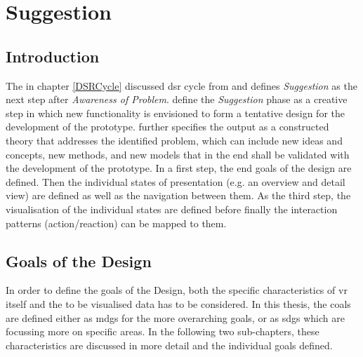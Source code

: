 
\chapter{Suggestion}

\label{ChapterSuggestion}


\section{Introduction}

The in chapter \ref{DSRCycle} discussed \gls{dsr} cycle from \cite{Vaishnavi2008} and \cite{Hevner2010} defines \textit{Suggestion} as the next step after \textit{Awareness of Problem}. \cite{Vaishnavi2008} define the \textit{Suggestion} phase as a creative step in which new functionality is envisioned to form a tentative design for the development of the prototype. \cite{Vaishnavi2008} further specifies the output as a constructed theory that addresses the identified problem, which can include new ideas and concepts, new methods, and new models that in the end shall be validated with the development of the prototype. \newline
In a first step, the end goals of the design are defined. Then the individual states of presentation (e.g. an overview and detail view) are defined as well as the navigation between them. As the third step, the visualisation of the individual states are defined before finally the interaction patterns (action/reaction) can be mapped to them.



\section{Goals of the Design}

In order to define the goals of the Design, both the specific characteristics of \gls{vr} itself and the to be visualised data has to be considered. In this thesis, the coals are defined either as \glspl{mdg} for the more overarching goals, or as \glspl{sdg} which are focussing more on specific areas. In the following two sub-chapters, these characteristics are discussed in more detail and the individual goals defined.


